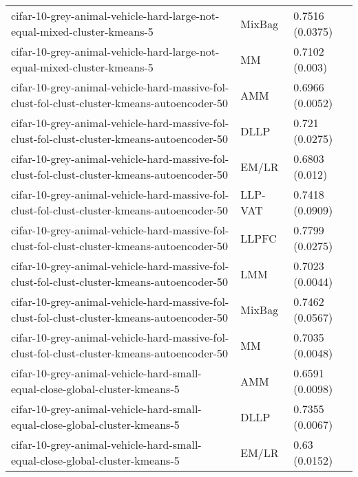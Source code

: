 \begin{longtable}{lll}
                                     cifar-10-grey-animal-vehicle-hard-large-not-equal-mixed-cluster-kmeans-5 &    MixBag &                       0.7516 (0.0375) \\
                                     cifar-10-grey-animal-vehicle-hard-large-not-equal-mixed-cluster-kmeans-5 &        MM &                        0.7102 (0.003) \\
                  cifar-10-grey-animal-vehicle-hard-massive-fol-clust-fol-clust-cluster-kmeans-autoencoder-50 &       AMM &                       0.6966 (0.0052) \\
                  cifar-10-grey-animal-vehicle-hard-massive-fol-clust-fol-clust-cluster-kmeans-autoencoder-50 &      DLLP &                        0.721 (0.0275) \\
                  cifar-10-grey-animal-vehicle-hard-massive-fol-clust-fol-clust-cluster-kmeans-autoencoder-50 &     EM/LR &                        0.6803 (0.012) \\
                  cifar-10-grey-animal-vehicle-hard-massive-fol-clust-fol-clust-cluster-kmeans-autoencoder-50 &   LLP-VAT &                       0.7418 (0.0909) \\
                  cifar-10-grey-animal-vehicle-hard-massive-fol-clust-fol-clust-cluster-kmeans-autoencoder-50 &     LLPFC &                       0.7799 (0.0275) \\
                  cifar-10-grey-animal-vehicle-hard-massive-fol-clust-fol-clust-cluster-kmeans-autoencoder-50 &       LMM &                       0.7023 (0.0044) \\
                  cifar-10-grey-animal-vehicle-hard-massive-fol-clust-fol-clust-cluster-kmeans-autoencoder-50 &    MixBag &                       0.7462 (0.0567) \\
                  cifar-10-grey-animal-vehicle-hard-massive-fol-clust-fol-clust-cluster-kmeans-autoencoder-50 &        MM &                       0.7035 (0.0048) \\
                                  cifar-10-grey-animal-vehicle-hard-small-equal-close-global-cluster-kmeans-5 &       AMM &                       0.6591 (0.0098) \\
                                  cifar-10-grey-animal-vehicle-hard-small-equal-close-global-cluster-kmeans-5 &      DLLP &                       0.7355 (0.0067) \\
                                  cifar-10-grey-animal-vehicle-hard-small-equal-close-global-cluster-kmeans-5 &     EM/LR &                         0.63 (0.0152) \\

\end{longtable}
